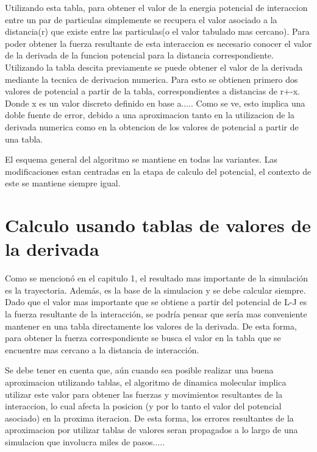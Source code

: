 


Utilizando esta tabla, para obtener el valor de la energia potencial de interaccion entre un par de particulas simplemente se recupera el valor asociado a la distancia(r) que existe entre las particulas(o el valor tabulado mas cercano).
Para poder obtener la fuerza resultante de esta interaccion es necesario conocer el valor de la derivada de la funcion potencial para la distancia correspondiente.
Utilizando la tabla descita previamente se puede obtener el valor de la derivada mediante la tecnica de derivacion numerica. 
Para esto se obtienen primero dos valores de potencial a partir de la tabla, correspondientes a distancias de r+-x. Donde x es un valor discreto definido en base a.....
Como se ve, esto implica una doble fuente de error, debido a una aproximacion tanto en la utilizacion de la derivada numerica como en la obtencion de los valores de potencial a partir de una tabla.


El esquema general del algoritmo se mantiene en todas las variantes. Las modificaciones estan centradas en la etapa de calculo del potencial, el contexto de este se mantiene siempre igual.



\section{Calculo usando tablas de valores de la derivada  }

Como se mencionó en el capitulo 1, el resultado mas importante de la simulación es la trayectoria. Además, es la base de la simulacion y se debe calcular siempre.
Dado que el valor mas importante que se obtiene a partir del potencial de L-J es la fuerza resultante de la interacción, se podría pensar que sería mas conveniente mantener en una tabla directamente los valores de la derivada. 
De esta forma, para obtener la fuerza correspondiente se busca el valor en la tabla que se encuentre mas cercano a la distancia de interacción. 



Se debe tener en cuenta que, aún cuando sea posible realizar una buena aproximacion utilizando tablas, el algoritmo de dinamica molecular implica utilizar este valor para obtener las fuerzas y movimientos resultantes de la interaccion, lo cual afecta la posicion (y por lo tanto el valor del potencial asociado) en la proxima iteracion. 
De esta forma, los errores resultantes de la aproximacion por utilizar tablas de valores seran propagados a lo largo de una simulacion que involucra miles de pasos.....


